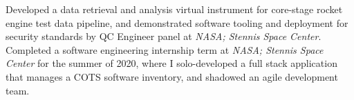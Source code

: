 \documentclass[
  a4paper, 
]{FormatDetails}
\begin{document}
\begin{cvtable}
    {Developed a data retrieval and analysis virtual instrument for core-stage rocket engine test data pipeline, and demonstrated software tooling and deployment for security standards by QC Engineer panel at \textit{NASA; Stennis Space Center}.}
    \vspace{2mm}
    {Completed a software engineering internship term at \textit{NASA; Stennis Space Center} for the summer of 2020, where I solo-developed a full stack application that manages a COTS software inventory, and shadowed an agile development team.}
\end{cvtable}
\end{document}
